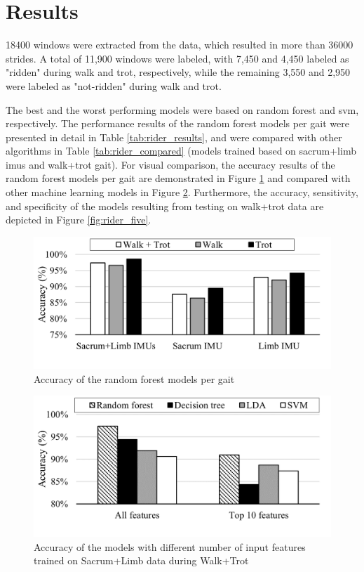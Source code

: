\section{Results}
\label{sec:results}

18400 windows were extracted from the data, which resulted in more than 36000 strides. A total of 11,900 windows were labeled, with 7,450 and 4,450 labeled as "ridden" during walk and trot, respectively, while the remaining 3,550 and 2,950 were labeled as "not-ridden" during walk and trot. 

The best and the worst performing models were based on random forest and \gls{svm}, respectively. The performance results of the random forest models per gait were presented in detail in Table \ref{tab:rider_results}, and were compared with other algorithms in Table \ref{tab:rider_compared} (models trained based on sacrum+limb \gls{imu}s and walk+trot gait). For visual comparison, the accuracy results of the random forest models per gait are demonstrated in Figure \ref{fig:rider_three} and compared with other machine learning models in Figure \ref{fig:rider_four}. Furthermore, the accuracy, sensitivity, and specificity of the models resulting from testing on walk+trot data are depicted in Figure \ref{fig:rider_five}. 




\begin{figure}[htbp]
\centering
\includegraphics[width=.8\linewidth]{chapters/rider/figures/Picture3.png}
\caption{Accuracy of the random forest models per gait}
\label{fig:rider_three}
\end{figure}

\begin{figure}[htbp]
\centering
\includegraphics[width=.8\linewidth]{chapters/rider/figures/Picture4.png}
\caption{Accuracy of the models with different number of input features trained on Sacrum+Limb data during Walk+Trot}
\label{fig:rider_four}
\end{figure}

